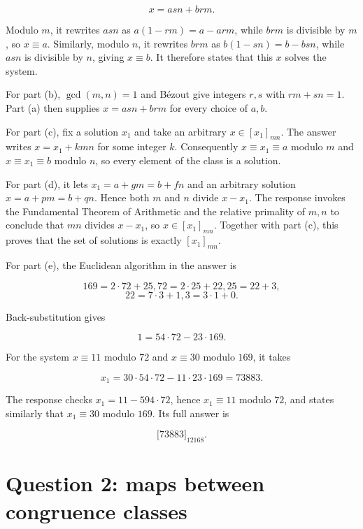\[x = asn + brm.\]

Modulo \(m\), it rewrites \(asn\) as \(a\left( {1 - rm} \right) = a - arm\), while \(brm\) is divisible by \(m\), so \(x \equiv a\). Similarly, modulo \(n\), it rewrites \(brm\) as \(b\left( {1 - sn} \right) = b - bsn\), while \(asn\) is divisible by \(n\), giving \(x \equiv b\). It therefore states that this \(x\) solves the system.

For part (b), \(\gcd\left( {m,n} \right) = 1\) and Bézout give integers \(r,s\) with \(rm + sn = 1\). Part (a) then supplies \(x = asn + brm\) for every choice of \(a,b\).

For part (c), fix a solution \(x_{1}\) and take an arbitrary \(x \in \left\lbrack x_{1} \right\rbrack_{mn}\). The answer writes \(x = x_{1} + kmn\) for some integer \(k\). Consequently \(x \equiv x_{1} \equiv a\) modulo \(m\) and \(x \equiv x_{1} \equiv b\) modulo \(n\), so every element of the class is a solution.

For part (d), it lets \(x_{1} = a + gm = b + fn\) and an arbitrary solution \(x = a + pm = b + qn\). Hence both \(m\) and \(n\) divide \(x - x_{1}\). The response invokes the Fundamental Theorem of Arithmetic and the relative primality of \(m,n\) to conclude that \(mn\) divides \(x - x_{1}\), so \(x \in \left\lbrack x_{1} \right\rbrack_{mn}\). Together with part (c), this proves that the set of solutions is exactly \(\left\lbrack x_{1} \right\rbrack_{mn}\).

For part (e), the Euclidean algorithm in the answer is

\[169 = 2 \cdot 72 + 25,72 = 2 \cdot 25 + 22,25 = 22 + 3,\]\[22 = 7 \cdot 3 + 1,3 = 3 \cdot 1 + 0.\]

Back-substitution gives

\[1 = 54 \cdot 72 - 23 \cdot 169.\]

For the system \(x \equiv 11\) modulo \(72\) and \(x \equiv 30\) modulo \(169\), it takes

\[x_{1} = 30 \cdot 54 \cdot 72 - 11 \cdot 23 \cdot 169 = 73883.\]

The response checks \(x_{1} = 11 - 594 \cdot 72\), hence \(x_{1} \equiv 11\) modulo \(72\), and states similarly that \(x_{1} \equiv 30\) modulo \(169\). Its full answer is

\[\lbrack 73883\rbrack_{12168}.\]

\section{Question 2: maps between congruence classes}

